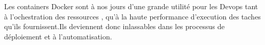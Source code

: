 Les containers Docker sont à nos jours d'une grande utilité pour les Devops tant à l'ochestration des ressources , qu'à la haute performance d'execution des taches qu'ils fournissent.Ils deviennent donc inlassables dans les processus de déploiement et à l'automatisation. 
